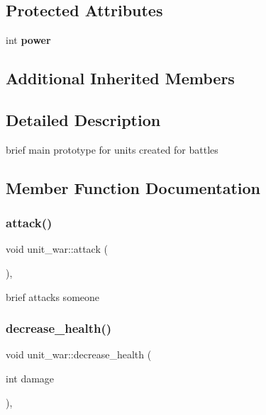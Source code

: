 \subsection*{Protected Attributes}
\begin{DoxyCompactItemize}
\item 
\mbox{\label{classunit__war_a05e852a78db3b69cbbf0b73a568f9dc2}} 
int {\bfseries power}
\end{DoxyCompactItemize}
\subsection*{Additional Inherited Members}


\subsection{Detailed Description}
brief main prototype for units created for battles 

\subsection{Member Function Documentation}
\mbox{\label{classunit__war_a9f1ae061c0761d35bdaaac8098d69dd0}} 
\subsubsection{\texorpdfstring{attack()}{attack()}}
{\footnotesize\ttfamily void unit\+\_\+war\+::attack (\begin{DoxyParamCaption}{ }\end{DoxyParamCaption})\hspace{0.3cm}{\ttfamily [inline]}, {\ttfamily [protected]}}

brief attacks someone \mbox{\label{classunit__war_ae171887cd752f92cee8cc4e32c541684}} 
\subsubsection{\texorpdfstring{decrease\+\_\+health()}{decrease\_health()}}
{\footnotesize\ttfamily void unit\+\_\+war\+::decrease\+\_\+health (\begin{DoxyParamCaption}\item[{int}]{damage }\end{DoxyParamCaption})\hspace{0.3cm}{\ttfamily [inline]}, {\ttfamily [protected]}}

